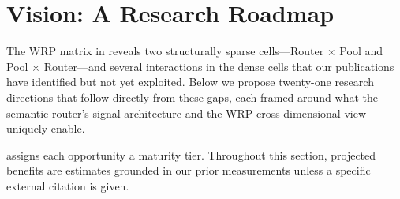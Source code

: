 \section{Vision: A Research Roadmap}
\label{sec:vision}

The WRP matrix in  reveals two structurally
sparse cells---Router $\times$ Pool and Pool $\times$ Router---and
several interactions in the dense cells that our publications have
identified but not yet exploited.  Below we propose twenty-one research
directions that follow directly from these gaps, each framed around
what the semantic router's signal architecture and the WRP
cross-dimensional view uniquely enable.

 assigns each opportunity a maturity tier.
Throughout this section, projected benefits are estimates grounded
in our prior measurements unless a specific external citation is
given.

